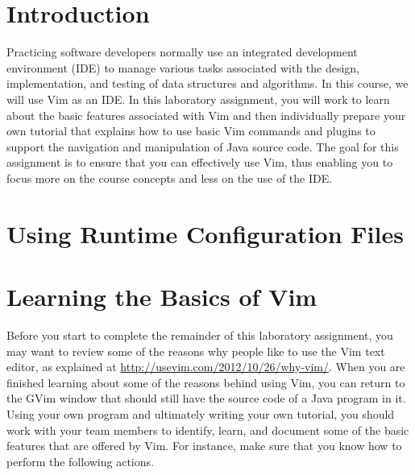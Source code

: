 


\usepackage[compact]{titlesec}



\section*{Introduction}

Practicing software developers normally use an integrated development environment (IDE) to manage various tasks
associated with the design, implementation, and testing of data structures and algorithms. In this course, we will use
Vim as an IDE.  In this laboratory assignment, you will work to learn about the basic features associated with Vim and
then individually prepare your own tutorial that explains how to use basic Vim commands and plugins to support the
navigation and manipulation of Java source code.  The goal for this assignment is to ensure that you can effectively use
Vim, thus enabling you to focus more on the course concepts and less on the use of the IDE.

\section*{Using Runtime Configuration Files}



\section*{Learning the Basics of Vim}

Before you start to complete the remainder of this laboratory assignment, you may want to review some of the reasons why people
like to use the Vim text editor, as explained at \url{http://usevim.com/2012/10/26/why-vim/}.  When you are finished learning about
some of the reasons behind using Vim, you can return to the GVim window that should still have the source code of a Java program
in it. Using your own program and ultimately writing your own tutorial, you should work with your team members to identify,
learn, and document some of the basic features that are offered by Vim.  For instance, make sure that you know how to perform the
following actions.

